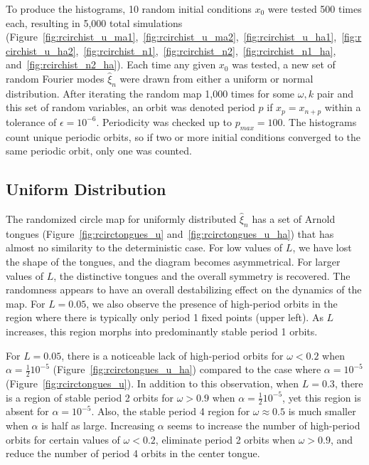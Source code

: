 To produce the histograms, 10 random initial conditions $x_0$ were tested 500 times
each, resulting in 5,000 total simulations
(Figure~\ref{fig:rcirchist_u_ma1},~\ref{fig:rcirchist_u_ma2},~\ref{fig:rcirchist_u_ha1},~\ref{fig:rcirchist_u_ha2},~\ref{fig:rcirchist_n1},~\ref{fig:rcirchist_n2},~\ref{fig:rcirchist_n1_ha}, and~\ref{fig:rcirchist_n2_ha}). Each time any given $x_0$
was tested, a new set of random Fourier modes $\hat{\xi}_n$ were drawn
from either a uniform or normal distribution. After iterating the random
map 1,000 times for some $\omega,k$ pair and this set of random variables, an orbit was denoted period $p$ if $x_p = x_{n+p}$ within a
tolerance of $\epsilon = 10^{-6}$. Periodicity was checked up to
$p_{max}=100$. The histograms count unique periodic orbits, so if two
or more initial conditions converged to the same periodic orbit, only
one was counted. 
\subsection{Uniform Distribution}
The randomized circle map for uniformly distributed $\hat{\xi}_n$ has
a set of Arnold tongues (Figure~\ref{fig:rcirctongues_u} and~\ref{fig:rcirctongues_u_ha}) that has almost no similarity to the deterministic
case. For low values of $L$, we have lost the
shape of the tongues, and the diagram becomes asymmetrical. For larger
values of $L$, the distinctive tongues and the overall symmetry is
recovered. The randomness appears to have an overall destabilizing
effect on the dynamics of the map. For $L=0.05$, we also observe the
presence of high-period orbits in the region where there is typically
only period 1 fixed points (upper left). As $L$ increases, this region
morphs into predominantly stable period 1 orbits. 

For $L=0.05$, there is a noticeable lack of high-period orbits for
$\omega<0.2$ when $\alpha = \frac{1}{2}10^{-5}$
(Figure~\ref{fig:rcirctongues_u_ha}) compared to the case where
$\alpha = 10^{-5}$ (Figure~\ref{fig:rcirctongues_u}). In addition to
this observation, when $L=0.3$, there is a region of stable period 2
orbits for $\omega > 0.9$ when $\alpha = \frac{1}{2}10^{-5}$, yet this
region is absent for $\alpha = 10^{-5}$. Also, the stable period 4
region for $\omega \approx 0.5$ is much smaller when $\alpha$ is half
as large. Increasing $\alpha$ seems to increase the number of
high-period orbits for certain values of $\omega < 0.2$, eliminate period
2 orbits when $\omega >0.9$, and reduce the number of period 4 orbits
in the center tongue. 

